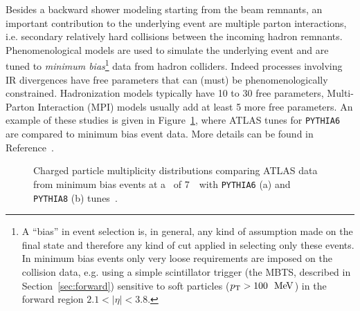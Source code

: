 Besides a backward shower modeling starting from the beam remnants, an
important contribution to the underlying event are multiple parton interactions,
i.e. secondary relatively hard collisions between the incoming hadron remnants.
Phenomenological models are used to simulate the underlying event
and are tuned to {\it minimum bias}\footnote{A ``bias'' in event selection
is, in general, any kind of assumption made on the final state and therefore
any kind of cut applied in selecting only these events. In minimum bias events
only very loose requirements are imposed on the collision data, e.g.
using a simple scintillator trigger (the MBTS, described in Section~\ref{sec:forward}) 
sensitive to soft particles ($\pt>100~\mev$) 
in the forward region $2.1<|\eta|<3.8$.} %
data from hadron colliders. Indeed processes involving IR divergences 
have free parameters that can (must) be phenomenologically constrained.
Hadronization models typically have 10 to 30 free parameters, 
Multi-Parton Interaction (MPI) models usually add at least 5 more
free parameters. An example of these studies is given in 
Figure~\ref{fig:minbiastune}, where ATLAS tunes for \texttt{PYTHIA6}
are compared to minimum bias event data. More details can be found
in Reference~\cite{Buckley:2011vq}.

\begin{figure}[htb]\begin{center}
	\caption{Charged particle multiplicity distributions comparing ATLAS
        data from minimum bias events at a \cme\ of 7~\tev\ 
        with  \texttt{PYTHIA6} (a) and  \texttt{PYTHIA8} (b) tunes~\cite{Buckley:2011vq}.\label{fig:minbiastune}}
\end{center}\end{figure}


